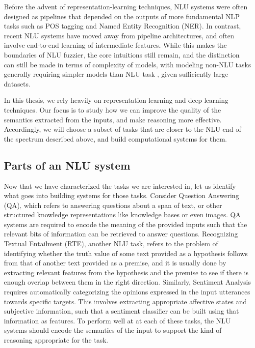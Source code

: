 Before the advent of representation-learning techniques, NLU systems were often designed as
pipelines that depended on the outputs of more fundamental NLP tasks such as POS tagging and Named
Entity Recognition (NER). In contrast, recent NLU systems have moved away from pipeline
architectures, and often involve end-to-end learning of intermediate features.  While this makes the
boundaries of NLU fuzzier, the core intuitions still remain, and the distinction can still be made
in terms of complexity of models, with modeling non-NLU tasks generally requiring simpler models
\citep{wang2015part} than NLU task \citep{chen2017enhanced}, given sufficiently large datasets.

In this thesis, we rely heavily on representation learning and deep learning techniques. Our focus
is to study how we can improve the quality of the semantics extracted from the inputs, and make
reasoning more effective.  Accordingly, we will choose a subset of tasks that are closer to the NLU
end of the spectrum described above, and build computational systems for them.


\subsection{Parts of an NLU system} Now that we have characterized the tasks we are interested in,
let us identify what goes into building systems for those tasks.  Consider Question Answering (QA),
which refers to answering questions about a span of text, or other structured knowledge
representations like knowledge bases or even images.  QA systems are required to encode the meaning
of the provided inputs such that the relevant bits of information can be retrieved to answer
questions.  Recognizing Textual Entailment (RTE), another NLU task, refers to the problem of
identifying whether the truth value of some text provided as a hypothesis follows from that of
another text provided as a premise, and it is usually done by extracting relevant features from the
hypothesis and the premise to see if there is enough overlap between them in the right direction.
Similarly, Sentiment Analysis requires automatically categorizing the opinions expressed in the
input utterances towards specific targets. This involves extracting appropriate affective states and
subjective information, such that a sentiment classifier can be built using that information as
features. To perform well at at each of these tasks, the NLU systems should encode the semantics of
the input to support the kind of reasoning appropriate for the task.

